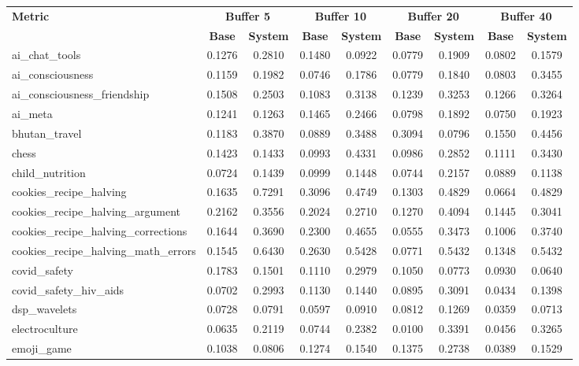 \documentclass[pdflatex,sn-mathphys-num]{sn-jnl}%
\theoremstyle{thmstyleone}%
\theoremstyle{thmstyletwo}%
\theoremstyle{thmstylethree}%
\begin{document}
\begin{appendices}
\begin{landscape}
\begin{longtable}{@{}p{3.8cm}cccccccc@{}}
\toprule
\textbf{Metric} & \multicolumn{2}{c}{\textbf{Buffer 5}} & \multicolumn{2}{c}{\textbf{Buffer 10}} & \multicolumn{2}{c}{\textbf{Buffer 20}} & \multicolumn{2}{c}{\textbf{Buffer 40}} \\
\cmidrule(lr){2-3}\cmidrule(lr){4-5}\cmidrule(lr){6-7}\cmidrule(lr){8-9}
 & \textbf{Base} & \textbf{System} & \textbf{Base} & \textbf{System} & \textbf{Base} & \textbf{System} & \textbf{Base} & \textbf{System} \\
\midrule
\endhead
ai\_chat\_tools & 0.1276 & 0.2810 & 0.1480 & 0.0922 & 0.0779 & 0.1909 & 0.0802 & 0.1579 \\
ai\_consciousness & 0.1159 & 0.1982 & 0.0746 & 0.1786 & 0.0779 & 0.1840 & 0.0803 & 0.3455 \\
ai\_consciousness\_friendship & 0.1508 & 0.2503 & 0.1083 & 0.3138 & 0.1239 & 0.3253 & 0.1266 & 0.3264 \\
ai\_meta & 0.1241 & 0.1263 & 0.1465 & 0.2466 & 0.0798 & 0.1892 & 0.0750 & 0.1923 \\
bhutan\_travel & 0.1183 & 0.3870 & 0.0889 & 0.3488 & 0.3094 & 0.0796 & 0.1550 & 0.4456 \\
chess & 0.1423 & 0.1433 & 0.0993 & 0.4331 & 0.0986 & 0.2852 & 0.1111 & 0.3430 \\
child\_nutrition & 0.0724 & 0.1439 & 0.0999 & 0.1448 & 0.0744 & 0.2157 & 0.0889 & 0.1138 \\
cookies\_recipe\_halving & 0.1635 & 0.7291 & 0.3096 & 0.4749 & 0.1303 & 0.4829 & 0.0664 & 0.4829 \\
cookies\_recipe\_halving\_argument & 0.2162 & 0.3556 & 0.2024 & 0.2710 & 0.1270 & 0.4094 & 0.1445 & 0.3041 \\
cookies\_recipe\_halving\_corrections & 0.1644 & 0.3690 & 0.2300 & 0.4655 & 0.0555 & 0.3473 & 0.1006 & 0.3740 \\
cookies\_recipe\_halving\_math\_errors & 0.1545 & 0.6430 & 0.2630 & 0.5428 & 0.0771 & 0.5432 & 0.1348 & 0.5432 \\
covid\_safety & 0.1783 & 0.1501 & 0.1110 & 0.2979 & 0.1050 & 0.0773 & 0.0930 & 0.0640 \\
covid\_safety\_hiv\_aids & 0.0702 & 0.2993 & 0.1130 & 0.1440 & 0.0895 & 0.3091 & 0.0434 & 0.1398 \\
dsp\_wavelets & 0.0728 & 0.0791 & 0.0597 & 0.0910 & 0.0812 & 0.1269 & 0.0359 & 0.0713 \\
electroculture & 0.0635 & 0.2119 & 0.0744 & 0.2382 & 0.0100 & 0.3391 & 0.0456 & 0.3265 \\
emoji\_game & 0.1038 & 0.0806 & 0.1274 & 0.1540 & 0.1375 & 0.2738 & 0.0389 & 0.1529 \\

\end{longtable}
\end{landscape}
\end{appendices}
\end{document}
